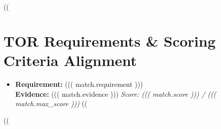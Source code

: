 \documentclass[10pt,a4paper]{article}
\begin{document}
((%
\section*{TOR Requirements \& Scoring Criteria Alignment}
\begin{itemize}[leftmargin=*]
((%
    \item[] \textbf{Requirement:} ((( match.requirement ))) \\
    \textbf{Evidence:} ((( match.evidence ))) \hfill \textit{Score: ((( match.score ))) / ((( match.max_score )))}
    \vspace{0.15cm}
((%
\end{itemize}
((%
\end{document}
